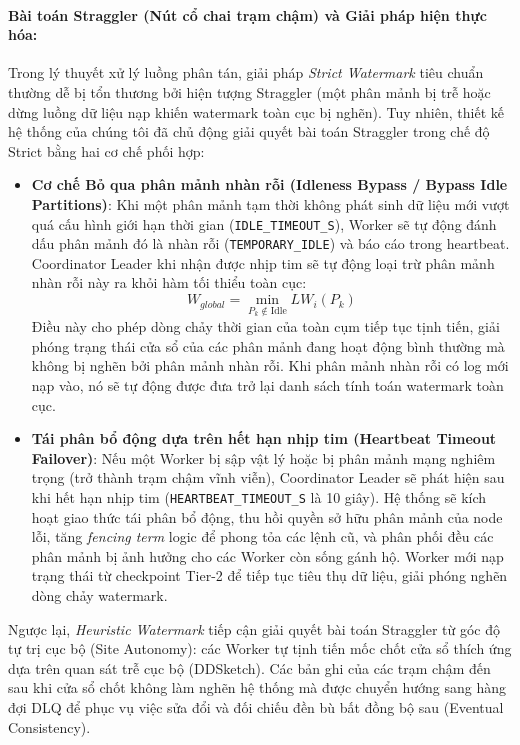 \documentclass[12pt,a4paper]{article}
\begin{document}
\paragraph{Bài toán Straggler (Nút cổ chai trạm chậm) và Giải pháp hiện thực hóa:}
Trong lý thuyết xử lý luồng phân tán, giải pháp \textit{Strict Watermark} tiêu chuẩn thường dễ bị tổn thương bởi hiện tượng Straggler (một phân mảnh bị trễ hoặc dừng luồng dữ liệu nạp khiến watermark toàn cục bị nghẽn). Tuy nhiên, thiết kế hệ thống của chúng tôi đã chủ động giải quyết bài toán Straggler trong chế độ Strict bằng hai cơ chế phối hợp:
\begin{itemize}
    \item \textbf{Cơ chế Bỏ qua phân mảnh nhàn rỗi (Idleness Bypass / Bypass Idle Partitions)}: Khi một phân mảnh tạm thời không phát sinh dữ liệu mới vượt quá cấu hình giới hạn thời gian (\texttt{IDLE\_TIMEOUT\_S}), Worker sẽ tự động đánh dấu phân mảnh đó là nhàn rỗi (\texttt{TEMPORARY\_IDLE}) và báo cáo trong heartbeat. Coordinator Leader khi nhận được nhịp tim sẽ tự động loại trừ phân mảnh nhàn rỗi này ra khỏi hàm tối thiểu toàn cục:
    {\large
    \begin{equation}
        \boxed{W_{global} = \min_{P_k \notin \text{Idle}} LW_i(P_k)}
    \end{equation}
    }
    Điều này cho phép dòng chảy thời gian của toàn cụm tiếp tục tịnh tiến, giải phóng trạng thái cửa sổ của các phân mảnh đang hoạt động bình thường mà không bị nghẽn bởi phân mảnh nhàn rỗi. Khi phân mảnh nhàn rỗi có log mới nạp vào, nó sẽ tự động được đưa trở lại danh sách tính toán watermark toàn cục.
    \item \textbf{Tái phân bổ động dựa trên hết hạn nhịp tim (Heartbeat Timeout Failover)}: Nếu một Worker bị sập vật lý hoặc bị phân mảnh mạng nghiêm trọng (trở thành trạm chậm vĩnh viễn), Coordinator Leader sẽ phát hiện sau khi hết hạn nhịp tim (\texttt{HEARTBEAT\_TIMEOUT\_S} là 10 giây). Hệ thống sẽ kích hoạt giao thức tái phân bổ động, thu hồi quyền sở hữu phân mảnh của node lỗi, tăng \textit{fencing term} logic để phong tỏa các lệnh cũ, và phân phối đều các phân mảnh bị ảnh hưởng cho các Worker còn sống gánh hộ. Worker mới nạp trạng thái từ checkpoint Tier-2 để tiếp tục tiêu thụ dữ liệu, giải phóng nghẽn dòng chảy watermark.
\end{itemize}

Ngược lại, \textit{Heuristic Watermark} tiếp cận giải quyết bài toán Straggler từ góc độ tự trị cục bộ (Site Autonomy): các Worker tự tịnh tiến mốc chốt cửa sổ thích ứng dựa trên quan sát trễ cục bộ (DDSketch). Các bản ghi của các trạm chậm đến sau khi cửa sổ chốt không làm nghẽn hệ thống mà được chuyển hướng sang hàng đợi DLQ để phục vụ việc sửa đổi và đối chiếu đền bù bất đồng bộ sau (Eventual Consistency).
\end{document}
